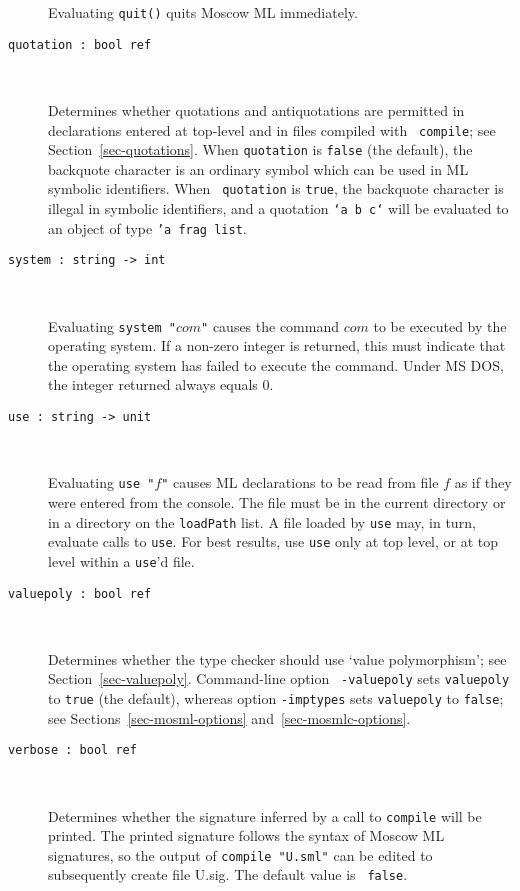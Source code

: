 \documentclass[fleqn]{article}
\begin{document}
\begin{description}
  Evaluating {\tt quit()} quits Moscow ML immediately.

\item[{\tt quotation :\ bool ref}]\mbox{ }

  Determines whether quotations and antiquotations are permitted in
  declarations entered at top-level and in files compiled with {\tt
    compile}; see Section~\ref{sec-quotations}.  When {\tt quotation}
  is {\tt false} (the default), the backquote character is an ordinary
  symbol which can be used in ML symbolic identifiers.  When {\tt
    quotation} is {\tt true}, the backquote character is illegal in
  symbolic identifiers, and a quotation {\tt `a b c`} will be
  evaluated to an object of type {\tt 'a frag list}.

\item[{\tt system :\ string -> int}]\mbox{ }

  Evaluating {\tt system "$com$"} causes the command $com$ to be
  executed by the operating system.  If a non-zero integer is
  returned, this must indicate that the operating system has failed to
  execute the command.  Under MS DOS, the integer returned always
  equals 0.

\item[{\tt use :\ string -> unit}]\mbox{ }

  Evaluating {\tt use "$f$"} causes ML declarations to be read from
  file $f$ as if they were entered from the console.  The file must be
  in the current directory or in a directory on the {\tt loadPath}
  list.  A file loaded by {\tt use} may, in turn, evaluate calls to
  {\tt use}.  For best results, use {\tt use} only at top level, or at
  top level within a {\tt use}'d file.

\item[{\tt valuepoly :\ bool ref}]\mbox{ }

  Determines whether the type checker should use `value polymorphism';
  see Section~\ref{sec-valuepoly}.  Command-line option {\tt
    -valuepoly} sets {\tt valuepoly} to {\tt true} (the default),
  whereas option {\tt -imptypes} sets {\tt valuepoly} to {\tt false};
  see Sections~\ref{sec-mosml-options} and~\ref{sec-mosmlc-options}.

\item[{\tt verbose :\ bool ref}]\mbox{ }

  Determines whether the signature inferred by a call to {\tt compile}
  will be printed.  The printed signature follows the syntax of Moscow
  ML signatures, so the output of {\tt compile "{\rm U.sml}"} can be
  edited to subsequently create file U.sig.  The default value is {\tt
    false}.
\end{description}
\end{document}
